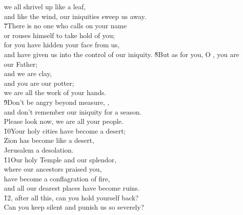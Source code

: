 \begin{poetry}
\poeml we all shrivel up like a leaf, \\
\poemll    and like the wind, our iniquities sweep us away. \\
\poeml \v{7}There is no one who calls on your name \\
\poemll    or rouses himself to take hold of you; \\
\poeml for you have hidden your face from us, \\
\poemll    and have given us into the control of our iniquity.
\poeml \v{8}But as for you, O , you are our Father; \\
\poemll    and we are clay, \\
\poeml and you are our potter; \\
\poemll    we are all the work of your hands. \\
\poeml \v{9}Don't be angry beyond measure, , \\
\poemll    and don't remember our iniquity for a season. \\
\poemlll       Please look now, we are all your people. \\
\poeml \v{10}Your holy cities have become a desert; \\
\poemll    Zion has become like a desert, \\
\poemlll       Jerusalem a desolation. \\
\poeml \v{11}Our holy Temple and our splendor, \\
\poemll    where our ancestors praised you, \\
\poeml have become a conflagration of fire, \\
\poemll    and all our dearest places have become ruins. \\
\poeml \v{12}, after all this, can you hold yourself back? \\
\poemll    Can you keep silent and punish us so severely?
\end{poetry}

